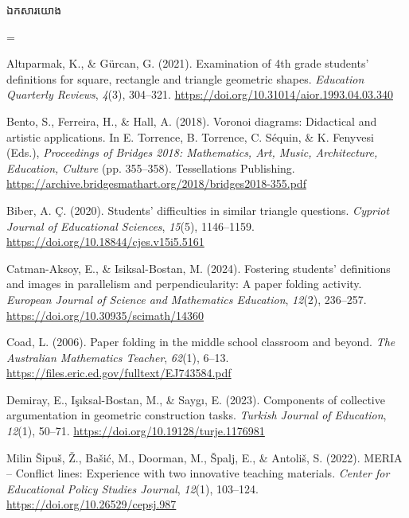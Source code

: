 \documentclass[a4paper,12pt]{article}
\newcommand{\refbanner}[1]{%
  \Needspace{2.2cm}%
  \vspace{2pt}%
  \begin{tcolorbox}[
    enhanced, sharp corners, colback=panelgray, colframe=black,
    boxrule=0.85pt, top=6pt, bottom=6pt, left=9pt, right=9pt,
    before skip=6pt, after skip=5pt
  ]
    {\muol\fontsize{12pt}{19pt}\selectfont #1}%
  \end{tcolorbox}%
}
\begin{document}
\vspace{6pt}
\refbanner{ឯកសារយោង}

{\TimesEn\linespread{1.0}\selectfont\fontsize{10.8pt}{16.2pt}\selectfont
\setlength{\parskip}{6.0pt}
\everypar={\hangindent=0.85cm }

Altıparmak, K., \& Gürcan, G. (2021). Examination of 4th grade students' definitions for square, rectangle and triangle geometric shapes. \textit{Education Quarterly Reviews}, \textit{4}(3), 304--321. \url{https://doi.org/10.31014/aior.1993.04.03.340}

Bento, S., Ferreira, H., \& Hall, A. (2018). Voronoi diagrams: Didactical and artistic applications. In E. Torrence, B. Torrence, C. Séquin, \& K. Fenyvesi (Eds.), \textit{Proceedings of Bridges 2018: Mathematics, Art, Music, Architecture, Education, Culture} (pp. 355--358). Tessellations Publishing. \url{https://archive.bridgesmathart.org/2018/bridges2018-355.pdf}

Biber, A. Ç. (2020). Students' difficulties in similar triangle questions. \textit{Cypriot Journal of Educational Sciences}, \textit{15}(5), 1146--1159. \url{https://doi.org/10.18844/cjes.v15i5.5161}

Catman-Aksoy, E., \& Isiksal-Bostan, M. (2024). Fostering students' definitions and images in parallelism and perpendicularity: A paper folding activity. \textit{European Journal of Science and Mathematics Education}, \textit{12}(2), 236--257. \url{https://doi.org/10.30935/scimath/14360}

Coad, L. (2006). Paper folding in the middle school classroom and beyond. \textit{The Australian Mathematics Teacher}, \textit{62}(1), 6--13. \url{https://files.eric.ed.gov/fulltext/EJ743584.pdf}

Demiray, E., Işıksal-Bostan, M., \& Saygı, E. (2023). Components of collective argumentation in geometric construction tasks. \textit{Turkish Journal of Education}, \textit{12}(1), 50--71. \url{https://doi.org/10.19128/turje.1176981}

Milin Šipuš, Ž., Bašić, M., Doorman, M., Špalj, E., \& Antoliš, S. (2022). MERIA -- Conflict lines: Experience with two innovative teaching materials. \textit{Center for Educational Policy Studies Journal}, \textit{12}(1), 103--124. \url{https://doi.org/10.26529/cepsj.987}

}
\end{document}
